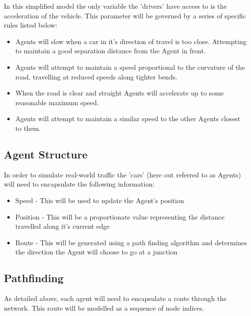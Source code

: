         In this simplified model the only variable the 'drivers' have access to is the acceleration of the vehicle. This parameter will be governed by a series of specific rules listed below:

        \begin{itemize}
            \item Agents will slow when a car in it's direction of travel is too close. Attempting to maintain a good separation distance from the Agent in front.

            \item Agents will attempt to maintain a speed proportional to the curvature of the road, travelling at reduced speeds along tighter bends.

            \item When the road is clear and straight Agents will accelerate up to some reasonable maximum speed.

            \item Agents will attempt to maintain a similar speed to the other Agents closest to them.
        \end{itemize}

    \subsection{Agent Structure}

        In order to simulate real-world traffic the 'cars' (here out referred to as Agents) will need to encapsulate the following information:

    \begin{itemize}
        \item Speed - This will be used to update the Agent's position
        \item Position - This will be a proportionate value representing the distance travelled along it's current edge
        \item Route - This will be generated using a path finding algorithm and determines the direction the Agent will choose to go at a junction
    \end{itemize}

    \subsection{Pathfinding}

        As detailed above, each agent will need to encapsulate a route through the network. This route will be modelled as a sequence of node indices.

